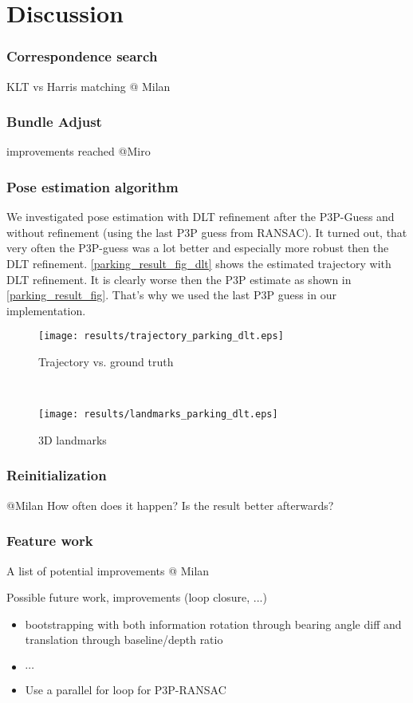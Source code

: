 \section{Discussion}

\subsubsection{Correspondence search}
KLT vs Harris matching
@ Milan

\subsubsection{Bundle Adjust}
improvements reached
@Miro

\subsubsection{Pose estimation algorithm}
We investigated pose estimation with DLT refinement after the P3P-Guess and without refinement (using the last P3P guess from RANSAC). It turned out, that very often the P3P-guess was a lot better and especially more robust then the DLT refinement. \cref{parking_result_fig_dlt} shows the estimated trajectory with DLT refinement. It is clearly worse then the P3P estimate as shown in \cref{parking_result_fig}. That's why we used the last P3P guess in our implementation.
\begin{figure*}[ht!]
    \centering
    \begin{subfigure}[t]{0.5\textwidth}
        \centering
        \texttt{[image: results/trajectory\_parking\_dlt.eps]} 
        \caption{Trajectory vs. ground truth}
    \end{subfigure}%
    ~ 
    \begin{subfigure}[t]{0.5\textwidth}
        \centering
        \texttt{[image: results/landmarks\_parking\_dlt.eps]}
        \caption{3D landmarks}
    \end{subfigure}
    \caption{Parking Dataset Results with DLT refinement}
		\label{parking_result_fig_dlt}
\end{figure*}

\subsubsection{Reinitialization}
@Milan
How often does it happen? Is the result better afterwards?

\subsubsection{Feature work}
A list of potential improvements
@ Milan

Possible future work, improvements (loop closure, ...)

\begin{itemize}
\item bootstrapping with both information rotation through bearing angle diff and translation through baseline/depth ratio
\item $\cdots$
\item Use a parallel for loop for P3P-RANSAC
\end{itemize}
